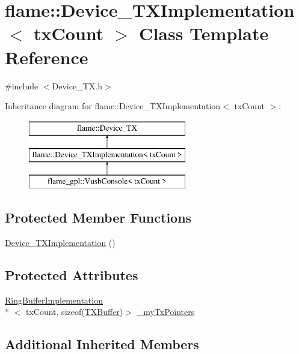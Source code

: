 \hypertarget{classflame_1_1_device___t_x_implementation}{\section{flame\-:\-:Device\-\_\-\-T\-X\-Implementation$<$ tx\-Count $>$ Class Template Reference}
\label{classflame_1_1_device___t_x_implementation}
}


{\ttfamily \#include $<$Device\-\_\-\-T\-X.\-h$>$}

Inheritance diagram for flame\-:\-:Device\-\_\-\-T\-X\-Implementation$<$ tx\-Count $>$\-:\begin{figure}[H]
\begin{center}
\leavevmode
\includegraphics[height=3.000000cm]{classflame_1_1_device___t_x_implementation}
\end{center}
\end{figure}
\subsection*{Protected Member Functions}
\begin{DoxyCompactItemize}
\item 
\hyperlink{classflame_1_1_device___t_x_implementation_a1a6bbd9f10423a8e18a72a1b6aa3335a}{Device\-\_\-\-T\-X\-Implementation} ()
\end{DoxyCompactItemize}
\subsection*{Protected Attributes}
\begin{DoxyCompactItemize}
\item 
\hyperlink{classflame_1_1_ring_buffer_implementation}{Ring\-Buffer\-Implementation}\\*
$<$ tx\-Count, sizeof(\hyperlink{classflame_1_1_t_x_buffer}{T\-X\-Buffer})$>$ \hyperlink{classflame_1_1_device___t_x_implementation_a53941d1a746623722c4d3a4e5de05f78}{\-\_\-my\-Tx\-Pointers}
\end{DoxyCompactItemize}
\subsection*{Additional Inherited Members}


